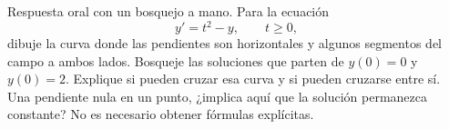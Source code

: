 Respuesta oral con un bosquejo a mano. Para la ecuación
\[
y'=t^2-y,\qquad t\ge0,
\]
dibuje la curva donde las pendientes son horizontales y algunos segmentos del campo a ambos lados. Bosqueje las soluciones que parten de \(y(0)=0\) y \(y(0)=2\). Explique si pueden cruzar esa curva y si pueden cruzarse entre sí. Una pendiente nula en un punto, ¿implica aquí que la solución permanezca constante? No es necesario obtener fórmulas explícitas.
